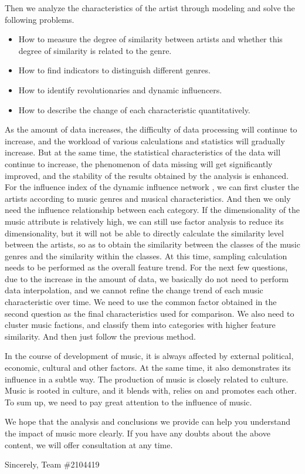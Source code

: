 \documentclass{mcmthesis}
\begin{document}
\begin{appendices}
Then we analyze the characteristics of the artist through modeling and solve the following problems.
\begin{itemize}
	\item How to measure the degree of similarity between artists and whether this degree of similarity is related to the genre.
	\item How to find indicators to distinguish different genres.
	\item How to identify revolutionaries and dynamic influencers.
	\item How to describe the change of each characteristic quantitatively.
\end{itemize}
As the amount of data increases, the difficulty of data processing will continue to increase, and the workload of various calculations and statistics will gradually increase. But at the same time, the statistical characteristics of the data will continue to increase, the phenomenon of data missing will get significantly improved, and the stability of the results obtained by the analysis is enhanced.
For the influence index of the dynamic influence network , we can first cluster the artists according to music genres and musical characteristics. And then we only need the influence relationship between each category. If the dimensionality of the music attribute is relatively high, we can still use factor analysis to reduce its dimensionality, but it will not be able to directly calculate the similarity level between the artists, so as to obtain the similarity between the classes of the music genres and the similarity within the classes. At this time, sampling calculation needs to be performed as the overall feature trend. For the next few questions, due to the increase in the amount of data, we basically do not need to perform data interpolation, and we cannot refine the change trend of each music characteristic over time. We need to use the common factor obtained in the second question as the final characteristics used for comparison. We also need to cluster music factions, and classify them into categories with higher feature similarity. And then just follow the previous method.

In the course of development of music, it is always affected by external political, economic, cultural and other factors. At the same time, it also demonstrates its influence in a subtle way. The production of music is closely related to culture. Music is rooted in culture, and it blends with, relies on and promotes each other. To sum up, we need to pay great attention to the influence of music.

We hope that the analysis and conclusions we provide can help you understand the impact of music more clearly. If you have any doubts about the above content, we will offer consultation at any time.

Sincerely, 
Team $\#$2104419
\end{appendices}
\end{document}
